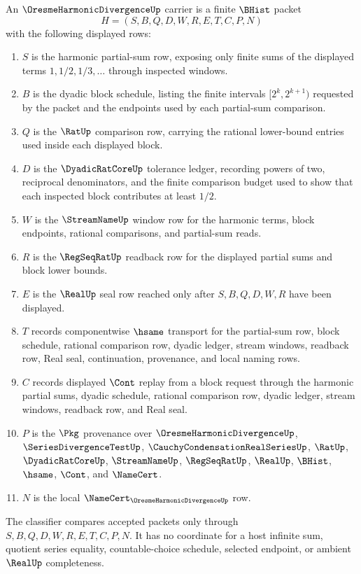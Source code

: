 \begin{definition}
\label{def:oresme-harmonic-divergence-carrier}
An $\OresmeHarmonicDivergenceUp$ carrier is a finite $\BHist$ packet
$$
H=(S,B,Q,D,W,R,E,T,C,P,N)
$$
with the following displayed rows:
\begin{enumerate}
\item $S$ is the harmonic partial-sum row, exposing only finite sums of the displayed terms $1,1/2,1/3,\ldots$ through inspected windows.
\item $B$ is the dyadic block schedule, listing the finite intervals $[2^k,2^{k+1})$ requested by the packet and the endpoints used by each partial-sum comparison.
\item $Q$ is the $\RatUp$ comparison row, carrying the rational lower-bound entries used inside each displayed block.
\item $D$ is the $\DyadicRatCoreUp$ tolerance ledger, recording powers of two, reciprocal denominators, and the finite comparison budget used to show that each inspected block contributes at least $1/2$.
\item $W$ is the $\StreamNameUp$ window row for the harmonic terms, block endpoints, rational comparisons, and partial-sum reads.
\item $R$ is the $\RegSeqRatUp$ readback row for the displayed partial sums and block lower bounds.
\item $E$ is the $\RealUp$ seal row reached only after $S,B,Q,D,W,R$ have been displayed.
\item $T$ records componentwise $\hsame$ transport for the partial-sum row, block schedule, rational comparison row, dyadic ledger, stream windows, readback row, Real seal, continuation, provenance, and local naming rows.
\item $C$ records displayed $\Cont$ replay from a block request through the harmonic partial sums, dyadic schedule, rational comparison row, dyadic ledger, stream windows, readback row, and Real seal.
\item $P$ is the $\Pkg$ provenance over $\OresmeHarmonicDivergenceUp$, $\SeriesDivergenceTestUp$, $\CauchyCondensationRealSeriesUp$, $\RatUp$, $\DyadicRatCoreUp$, $\StreamNameUp$, $\RegSeqRatUp$, $\RealUp$, $\BHist$, $\hsame$, $\Cont$, and $\NameCert$.
\item $N$ is the local $\NameCert_{\OresmeHarmonicDivergenceUp}$ row.
\end{enumerate}
The classifier compares accepted packets only through $S,B,Q,D,W,R,E,T,C,P,N$. It has no coordinate for a host infinite sum, quotient series equality, countable-choice schedule, selected endpoint, or ambient $\RealUp$ completeness.
\end{definition}


